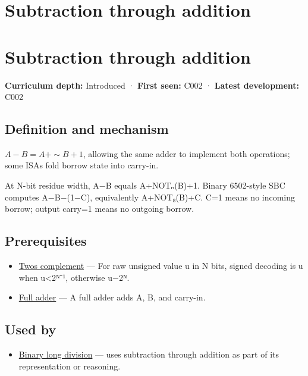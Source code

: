 \hypertarget{appendix-1c7df340573e}{}
\section*{Subtraction through addition}
\section{Subtraction through addition}\label{subtraction-through-addition}

\textbf{Curriculum depth:} Introduced · \textbf{First seen:} C002 · \textbf{Latest development:} C002

\subsection{Definition and mechanism}\label{definition-and-mechanism}

\(A-B=A+\sim B+1\), allowing the same adder to implement both operations; some ISAs fold borrow state into carry-in.

At N-bit residue width, A−B equals A+NOTₙ(B)+1. Binary 6502-style SBC computes A−B−(1−C), equivalently A+NOT₈(B)+C. C=1 means no incoming borrow; output carry=1 means no outgoing borrow.

\subsection{Prerequisites}\label{prerequisites}

\begin{itemize}
\tightlist
\item
  \hyperref[appendix-4fbc03d20829]{Two\textquotesingle s complement} --- For raw unsigned value u in N bits, signed decoding is u when u\textless2ᴺ⁻¹, otherwise u−2ᴺ.
\item
  \hyperref[appendix-d1a5b1e520c2]{Full adder} --- A full adder adds A, B, and carry-in.
\end{itemize}

\subsection{Used by}\label{used-by}

\begin{itemize}
\tightlist
\item
  \hyperref[appendix-89985e6a2685]{Binary long division} --- uses subtraction through addition as part of its representation or reasoning.
\end{itemize}

